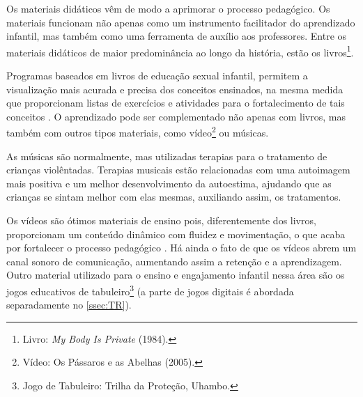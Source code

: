 



Os materiais didáticos vêm de modo a aprimorar o processo pedagógico. Os materiais funcionam não apenas como um instrumento facilitador do aprendizado infantil, mas também como uma ferramenta de auxílio aos professores. Entre os materiais didáticos de maior predominância ao longo da história, estão os livros\footnote{Livro: \textit{My Body Is Private} (1984).}.

Programas baseados em livros de educação sexual infantil, permitem a visualização mais acurada e precisa dos conceitos ensinados, na mesma medida que proporcionam listas de exercícios e atividades para o fortalecimento de tais conceitos \cite{maria2010papel}. O aprendizado pode ser complementado não apenas com livros, mas também com outros tipos materiais, como vídeo\footnote{Vídeo: Os Pássaros e as Abelhas (2005).} ou músicas.

As músicas são normalmente, mas utilizadas terapias para o tratamento de crianças violêntadas. Terapias musicais estão relacionadas com uma autoimagem mais positiva e um melhor desenvolvimento da autoestima, ajudando que as crianças se sintam melhor com elas mesmas, auxiliando assim, os tratamentos. %

Os vídeos são ótimos materiais de ensino pois, diferentemente dos livros, proporcionam um conteúdo dinâmico com fluidez e movimentação, o que acaba por fortalecer o processo pedagógico \cite{maria2010papel}. Há ainda o fato de que os vídeos abrem um canal sonoro de comunicação, aumentando assim a retenção e a aprendizagem. Outro material utilizado para o ensino e engajamento infantil nessa área são os jogos educativos de tabuleiro\footnote{Jogo de Tabuleiro: Trilha da Proteção, Uhambo.} (a parte de jogos digitais é abordada separadamente no \autoref{ssec:TR}).

